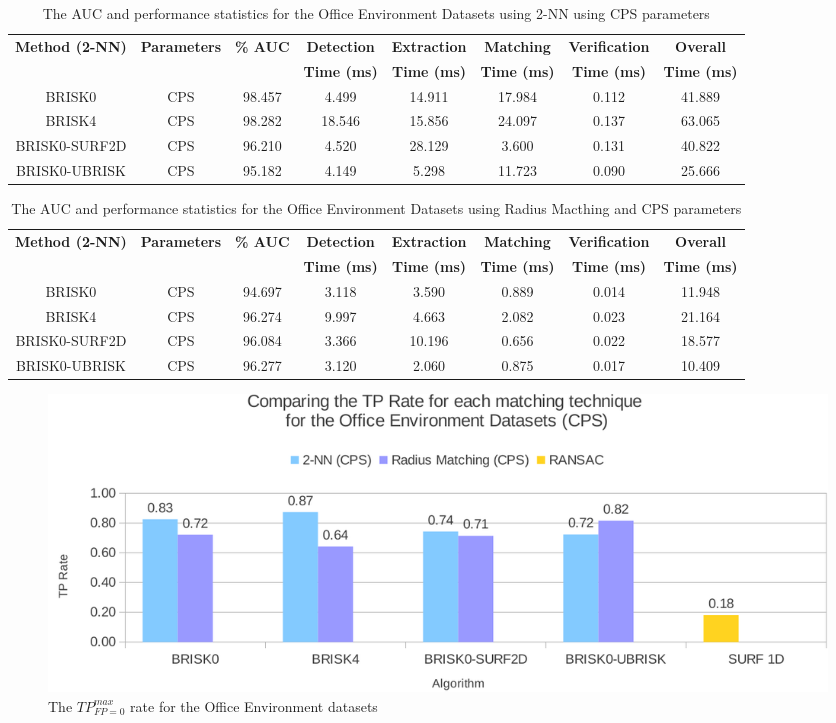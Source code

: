 \documentclass[11pt]{report}
\begin{document}
\begin{table}
\caption{The AUC and performance statistics for the Office Environment Datasets
using 2-NN using CPS parameters}
\begin{tabular}{|c|c|c|c|c|c|c|c|}
\hline 
\textbf{Method (2-NN)} & \textbf{Parameters} & \textbf{\% AUC} & \textbf{Detection} & \textbf{Extraction} & \textbf{Matching} & \textbf{Verification} & \textbf{Overall}\tabularnewline
 &  &  & \textbf{Time (ms)} & \textbf{Time (ms)} & \textbf{Time (ms)} & \textbf{Time (ms)} & \textbf{Time (ms)}\tabularnewline
\hline 
\hline 
BRISK0 & CPS & 98.457 & 4.499 & 14.911 & 17.984 & 0.112 & 41.889\tabularnewline
\hline 
BRISK4 & CPS & 98.282 & 18.546 & 15.856 & 24.097 & 0.137 & 63.065\tabularnewline
\hline 
BRISK0-SURF2D & CPS & 96.210 & 4.520 & 28.129 & 3.600 & 0.131 & 40.822\tabularnewline
\hline 
BRISK0-UBRISK & CPS & 95.182 & 4.149 & 5.298 & 11.723 & 0.090 & 25.666\tabularnewline
\hline 
\end{tabular}
\label{app:oe_knn}
\end{table}

\begin{table}
\caption{The AUC and performance statistics for the Office Environment Datasets
using Radius Macthing and CPS parameters}
\begin{tabular}{|c|c|c|c|c|c|c|c|}
\hline 
\textbf{Method (2-NN)} & \textbf{Parameters} & \textbf{\% AUC} & \textbf{Detection} & \textbf{Extraction} & \textbf{Matching} & \textbf{Verification} & \textbf{Overall}\tabularnewline
 &  &  & \textbf{Time (ms)} & \textbf{Time (ms)} & \textbf{Time (ms)} & \textbf{Time (ms)} & \textbf{Time (ms)}\tabularnewline
\hline 
\hline 
BRISK0 & CPS & 94.697 & 3.118 & 3.590 & 0.889 & 0.014 & 11.948\tabularnewline
\hline 
BRISK4 & CPS & 96.274 & 9.997 & 4.663 & 2.082 & 0.023 & 21.164\tabularnewline
\hline 
BRISK0-SURF2D & CPS & 96.084 & 3.366 & 10.196 & 0.656 & 0.022 & 18.577\tabularnewline
\hline 
BRISK0-UBRISK & CPS & 96.277 & 3.120 & 2.060 & 0.875 & 0.017 & 10.409\tabularnewline
\hline 
\end{tabular}
\label{app:oe_hamming}
\end{table}

\begin{figure}
  \centering
    \includegraphics[width=1.0\textwidth]{../Drawings/Graphs/tp_rate_oe_cps.pdf}
    \caption{The $TP_{FP=0}^{max}$ rate for the Office Environment datasets} 
    \label{app:tp_rate_oe}
\end{figure}
\end{document}
